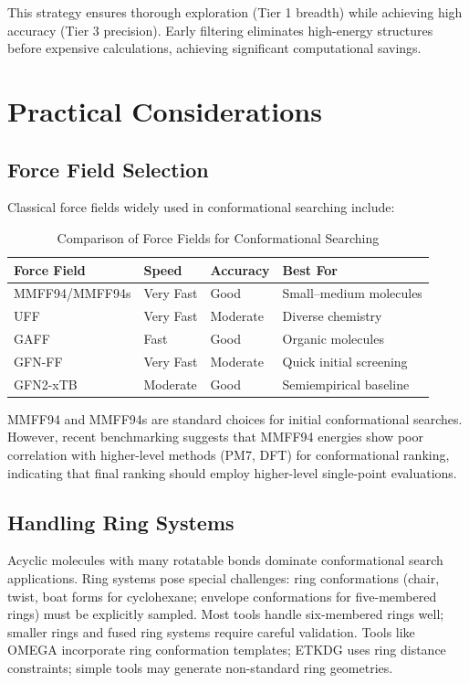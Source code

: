 \documentclass[12pt]{article}
\begin{document}
This strategy ensures thorough exploration (Tier 1 breadth) while achieving high accuracy (Tier 3 precision). Early filtering eliminates high-energy structures before expensive calculations, achieving significant computational savings.

\section{Practical Considerations}

\subsection{Force Field Selection}

Classical force fields widely used in conformational searching include:

\begin{table}[h!]
\centering
\caption{Comparison of Force Fields for Conformational Searching}
\label{tab:force_fields}
\begin{tabular}{l|l|l|l}
\toprule
\textbf{Force Field} & \textbf{Speed} & \textbf{Accuracy} & \textbf{Best For} \\
\midrule
MMFF94/MMFF94s & Very Fast & Good & Small--medium molecules \\
UFF & Very Fast & Moderate & Diverse chemistry \\
GAFF & Fast & Good & Organic molecules \\
GFN-FF & Very Fast & Moderate & Quick initial screening \\
GFN2-xTB & Moderate & Good & Semiempirical baseline \\
\bottomrule
\end{tabular}
\end{table}

MMFF94 and MMFF94s are standard choices for initial conformational searches. However, recent benchmarking suggests that MMFF94 energies show poor correlation with higher-level methods (PM7, DFT) for conformational ranking, indicating that final ranking should employ higher-level single-point evaluations.

\subsection{Handling Ring Systems}

Acyclic molecules with many rotatable bonds dominate conformational search applications. Ring systems pose special challenges: ring conformations (chair, twist, boat forms for cyclohexane; envelope conformations for five-membered rings) must be explicitly sampled. Most tools handle six-membered rings well; smaller rings and fused ring systems require careful validation. Tools like OMEGA incorporate ring conformation templates; ETKDG uses ring distance constraints; simple tools may generate non-standard ring geometries.
\end{document}
